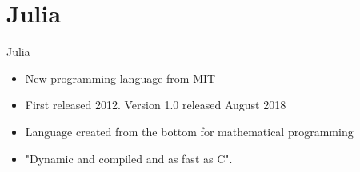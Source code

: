 \section{Julia}
\begin{frame}{Julia}
\begin{itemize}
    \item New programming language from MIT
    \item First released 2012. Version 1.0 released August 2018
    \item Language created from the bottom for mathematical programming
    \item "Dynamic and compiled and as fast as C".
\end{itemize}
\end{frame}